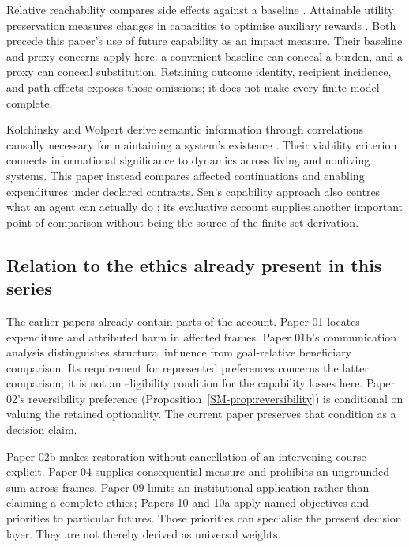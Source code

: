 \documentclass[11pt,a4paper]{article}
\theoremstyle{remark}
\begin{document}
Relative reachability compares side effects against a baseline
\citep{krakovna2018reachability}. Attainable utility preservation measures changes
in capacities to optimise auxiliary rewards \citep{turner2020}. Both precede
this paper's use of future capability as an impact measure. Their baseline and
proxy concerns apply here: a convenient baseline can conceal a burden, and a
proxy can conceal substitution. Retaining outcome identity, recipient incidence,
and path effects exposes those omissions; it does not make every finite model
complete.

Kolchinsky and Wolpert derive semantic information through correlations causally
necessary for maintaining a system's existence
\citep{kolchinskywolpert2018semantic}. Their viability criterion connects
informational significance to dynamics across living and nonliving systems.
This paper instead compares affected continuations and enabling expenditures
under declared contracts. Sen's capability approach also centres what an agent
can actually do \citep{sen1980equality}; its evaluative account supplies another
important point of comparison without being the source of the finite set
derivation.

\subsection{Relation to the ethics already present in this series}

The earlier papers already contain parts of the account. Paper 01 locates
expenditure and attributed harm in affected frames. Paper 01b's communication
analysis distinguishes structural influence from goal-relative beneficiary
comparison. Its requirement for represented preferences concerns the latter
comparison; it is not an eligibility condition for the capability losses here.
Paper 02's reversibility preference
(Proposition~\ref{SM-prop:reversibility}) is conditional on valuing the retained
optionality. The current paper preserves that condition as a decision claim.

Paper 02b makes restoration without cancellation of an intervening course
explicit. Paper 04 supplies consequential measure and prohibits an ungrounded
sum across frames. Paper 09 limits an institutional application rather than
claiming a complete ethics; Papers 10 and 10a apply named objectives and
priorities to particular futures. Those priorities can specialise the present
decision layer. They are not thereby derived as universal weights.
\end{document}

